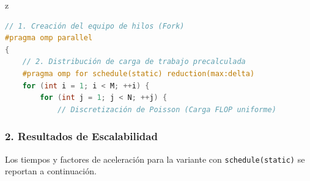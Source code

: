 z\documentclass[11pt,a4paper]{article}
\begin{document}
\begin{lstlisting}[language=C++, caption={Separación de la región paralela y particionamiento estático.}, label={lst:act4}]
// 1. Creación del equipo de hilos (Fork)
#pragma omp parallel
{
    // 2. Distribución de carga de trabajo precalculada
    #pragma omp for schedule(static) reduction(max:delta)
    for (int i = 1; i < M; ++i) {
        for (int j = 1; j < N; ++j) {
            // Discretización de Poisson (Carga FLOP uniforme)
\end{lstlisting}

\subsubsection*{2. Resultados de Escalabilidad}
Los tiempos y factores de aceleración para la variante con \texttt{schedule(static)} se reportan a continuación.
\end{document}
